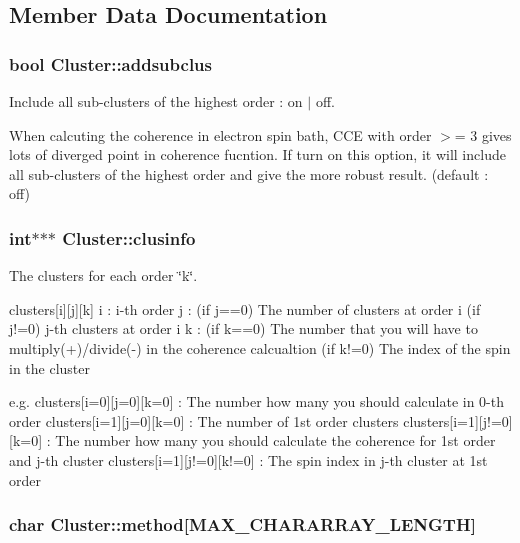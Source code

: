 \subsection{Member Data Documentation}
\hypertarget{structCluster_a33621fac416bdd2eea40805e74730748}{
\subsubsection[{addsubclus}]{\setlength{\rightskip}{0pt plus 5cm}bool Cluster\-::addsubclus}}\label{structCluster_a33621fac416bdd2eea40805e74730748}


Include all sub-\/clusters of the highest order \-: on $|$ off. 

When calcuting the coherence in electron spin bath, C\-C\-E with order $>$= 3 gives lots of diverged point in coherence fucntion. If turn on this option, it will include all sub-\/clusters of the highest order and give the more robust result. (default \-: off) \hypertarget{structCluster_afd65bde6cf52f123d1d1ab7a3fd9805c}{
\subsubsection[{clusinfo}]{\setlength{\rightskip}{0pt plus 5cm}int$\ast$$\ast$$\ast$ Cluster\-::clusinfo}}\label{structCluster_afd65bde6cf52f123d1d1ab7a3fd9805c}


The clusters for each order \char`\"{}k\char`\"{}. 

clusters\mbox{[}i\mbox{]}\mbox{[}j\mbox{]}\mbox{[}k\mbox{]} i \-: i-\/th order j \-: (if j==0) The number of clusters at order i (if j!=0) j-\/th clusters at order i k \-: (if k==0) The number that you will have to multiply(+)/divide(-\/) in the coherence calcualtion (if k!=0) The index of the spin in the cluster

e.\-g. clusters\mbox{[}i=0\mbox{]}\mbox{[}j=0\mbox{]}\mbox{[}k=0\mbox{]} \-: The number how many you should calculate in 0-\/th order clusters\mbox{[}i=1\mbox{]}\mbox{[}j=0\mbox{]}\mbox{[}k=0\mbox{]} \-: The number of 1st order clusters clusters\mbox{[}i=1\mbox{]}\mbox{[}j!=0\mbox{]}\mbox{[}k=0\mbox{]} \-: The number how many you should calculate the coherence for 1st order and j-\/th cluster clusters\mbox{[}i=1\mbox{]}\mbox{[}j!=0\mbox{]}\mbox{[}k!=0\mbox{]} \-: The spin index in j-\/th cluster at 1st order \hypertarget{structCluster_acfc81556c4ed78e0bce4c36119fe7150}{
\subsubsection[{method}]{\setlength{\rightskip}{0pt plus 5cm}char Cluster\-::method\mbox{[}M\-A\-X\-\_\-\-C\-H\-A\-R\-A\-R\-R\-A\-Y\-\_\-\-L\-E\-N\-G\-T\-H\mbox{]}}}\label{structCluster_acfc81556c4ed78e0bce4c36119fe7150}


